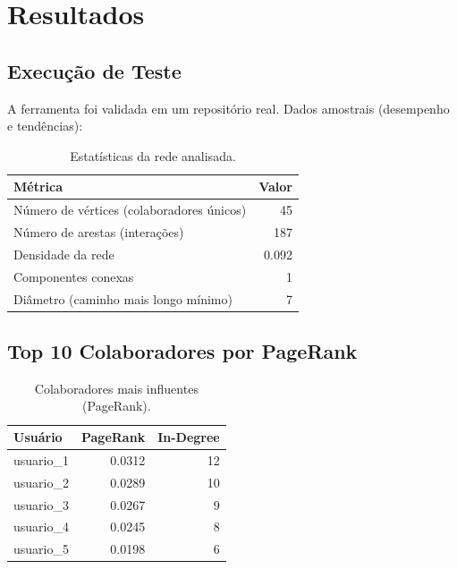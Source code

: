 \documentclass[12pt,a4paper]{article}
\begin{document}
\section{Resultados}\label{sec:resultados}

\subsection{Execução de Teste}

A ferramenta foi validada em um repositório real. Dados amostrais (desempenho e tendências):

\begin{table}[h]
  \centering
  \caption{Estatísticas da rede analisada.}
  \label{tab:stats}
  \begin{tabular}{l|r}
    \toprule
    \textbf{Métrica} & \textbf{Valor} \\
    \midrule
    Número de vértices (colaboradores únicos) & 45 \\
    Número de arestas (interações) & 187 \\
    Densidade da rede & 0.092 \\
    Componentes conexas & 1 \\
    Diâmetro (caminho mais longo mínimo) & 7 \\
    \bottomrule
  \end{tabular}
\end{table}

\subsection{Top 10 Colaboradores por PageRank}

\begin{table}[h]
  \centering
  \caption{Colaboradores mais influentes (PageRank).}
  \label{tab:pagerank}
  \begin{tabular}{l|r|r}
    \toprule
    \textbf{Usuário} & \textbf{PageRank} & \textbf{In-Degree} \\
    \midrule
    usuario\_1 & 0.0312 & 12 \\
    usuario\_2 & 0.0289 & 10 \\
    usuario\_3 & 0.0267 & 9 \\
    usuario\_4 & 0.0245 & 8 \\
    usuario\_5 & 0.0198 & 6 \\
    \bottomrule
  \end{tabular}
\end{table}
\end{document}
